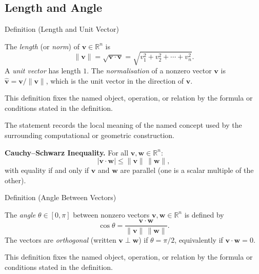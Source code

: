 \subsection*{Length and Angle}

\begin{definitionbox}{Definition (Length and Unit Vector)}
\begin{definition}
\label{def:length-unit-vector}
The \emph{length} (or \emph{norm}) of $\mathbf{v} \in \mathbb{R}^n$ is
\[
  \|\mathbf{v}\| = \sqrt{\mathbf{v} \cdot \mathbf{v}} = \sqrt{v_1^2 + v_2^2 + \cdots + v_n^2}.
\]
A \emph{unit vector} has length $1$.
The \emph{normalisation} of a nonzero vector $\mathbf{v}$ is
$\hat{\mathbf{v}} = \mathbf{v}/\|\mathbf{v}\|$, which is the unit vector in the direction of $\mathbf{v}$.
\end{definition}
\end{definitionbox}
\begin{remark*}
This definition fixes the named object, operation, or relation by the formula
or conditions stated in the definition.
\end{remark*}

\begin{remark*}[Interpretation]
The statement records the local meaning of the named concept used by the
surrounding computational or geometric construction.
\end{remark*}

\DefinitionalRoot

\begin{remark*}[Exposition]
\textbf{Cauchy--Schwarz Inequality.}
For all $\mathbf{v}, \mathbf{w} \in \mathbb{R}^n$:
\[
  |\mathbf{v} \cdot \mathbf{w}| \leq \|\mathbf{v}\|\,\|\mathbf{w}\|,
\]
with equality if and only if $\mathbf{v}$ and $\mathbf{w}$ are parallel
(one is a scalar multiple of the other).
\end{remark*}

\begin{definitionbox}{Definition (Angle Between Vectors)}
\begin{definition}
\label{def:angle-between-vectors}
The \emph{angle} $\theta \in [0, \pi]$ between nonzero vectors $\mathbf{v}, \mathbf{w} \in \mathbb{R}^n$
is defined by
\[
  \cos\theta = \frac{\mathbf{v} \cdot \mathbf{w}}{\|\mathbf{v}\|\,\|\mathbf{w}\|}.
\]
The vectors are \emph{orthogonal} (written $\mathbf{v} \perp \mathbf{w}$) if $\theta = \pi/2$,
equivalently if $\mathbf{v} \cdot \mathbf{w} = 0$.
\end{definition}
\end{definitionbox}
\begin{remark*}
This definition fixes the named object, operation, or relation by the formula
or conditions stated in the definition.
\end{remark*}

